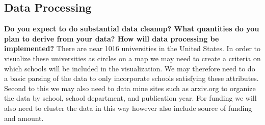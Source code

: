 \documentclass[11pt, a4paper]{article}
\begin{document}
\subsection{Data Processing}\textbf{ Do you expect to do substantial data cleanup? What quantities do you plan to derive from your data? How will data processing be implemented?}
  There are near 1016 universities in the United States. In order to visualize these universities as circles on a map we may need to create a criteria on which schools will be included in the visualization. We may therefore need to do a basic parsing of the data to only incorporate schools satisfying these attributes. Second to this we may also need to data mine sites such as arxiv.org to organize the data by school, school department, and publication year. For funding we will also need to cluster the data in this way however also include source of funding and amount. 
\end{document}
